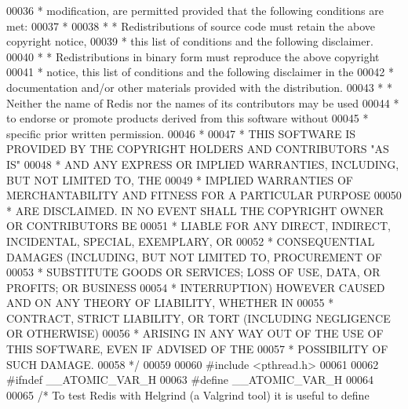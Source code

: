 \begin{DoxyCode}
00036 \textcolor{comment}{ * modification, are permitted provided that the following conditions are met:}
00037 \textcolor{comment}{ *}
00038 \textcolor{comment}{ *   * Redistributions of source code must retain the above copyright notice,}
00039 \textcolor{comment}{ *     this list of conditions and the following disclaimer.}
00040 \textcolor{comment}{ *   * Redistributions in binary form must reproduce the above copyright}
00041 \textcolor{comment}{ *     notice, this list of conditions and the following disclaimer in the}
00042 \textcolor{comment}{ *     documentation and/or other materials provided with the distribution.}
00043 \textcolor{comment}{ *   * Neither the name of Redis nor the names of its contributors may be used}
00044 \textcolor{comment}{ *     to endorse or promote products derived from this software without}
00045 \textcolor{comment}{ *     specific prior written permission.}
00046 \textcolor{comment}{ *}
00047 \textcolor{comment}{ * THIS SOFTWARE IS PROVIDED BY THE COPYRIGHT HOLDERS AND CONTRIBUTORS "AS IS"}
00048 \textcolor{comment}{ * AND ANY EXPRESS OR IMPLIED WARRANTIES, INCLUDING, BUT NOT LIMITED TO, THE}
00049 \textcolor{comment}{ * IMPLIED WARRANTIES OF MERCHANTABILITY AND FITNESS FOR A PARTICULAR PURPOSE}
00050 \textcolor{comment}{ * ARE DISCLAIMED. IN NO EVENT SHALL THE COPYRIGHT OWNER OR CONTRIBUTORS BE}
00051 \textcolor{comment}{ * LIABLE FOR ANY DIRECT, INDIRECT, INCIDENTAL, SPECIAL, EXEMPLARY, OR}
00052 \textcolor{comment}{ * CONSEQUENTIAL DAMAGES (INCLUDING, BUT NOT LIMITED TO, PROCUREMENT OF}
00053 \textcolor{comment}{ * SUBSTITUTE GOODS OR SERVICES; LOSS OF USE, DATA, OR PROFITS; OR BUSINESS}
00054 \textcolor{comment}{ * INTERRUPTION) HOWEVER CAUSED AND ON ANY THEORY OF LIABILITY, WHETHER IN}
00055 \textcolor{comment}{ * CONTRACT, STRICT LIABILITY, OR TORT (INCLUDING NEGLIGENCE OR OTHERWISE)}
00056 \textcolor{comment}{ * ARISING IN ANY WAY OUT OF THE USE OF THIS SOFTWARE, EVEN IF ADVISED OF THE}
00057 \textcolor{comment}{ * POSSIBILITY OF SUCH DAMAGE.}
00058 \textcolor{comment}{ */}
00059 
00060 \textcolor{preprocessor}{#}\textcolor{preprocessor}{include} \textcolor{preprocessor}{<}\textcolor{preprocessor}{pthread}\textcolor{preprocessor}{.}\textcolor{preprocessor}{h}\textcolor{preprocessor}{>}
00061 
00062 \textcolor{preprocessor}{#}\textcolor{preprocessor}{ifndef} \textcolor{preprocessor}{\_\_ATOMIC\_VAR\_H}
00063 \textcolor{preprocessor}{#}\textcolor{preprocessor}{define} \textcolor{preprocessor}{\_\_ATOMIC\_VAR\_H}
00064 
00065 \textcolor{comment}{/* To test Redis with Helgrind (a Valgrind tool) it is useful to define}

\end{DoxyCode}
